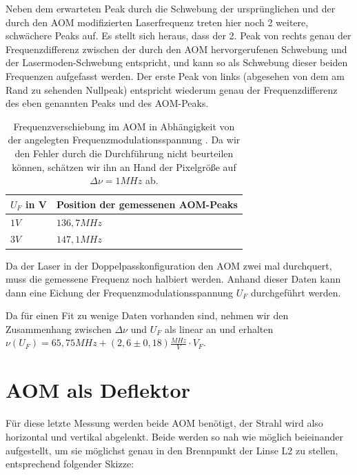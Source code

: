 \documentclass[bigchapter,colorback,accentcolor=tud4b,linedtoc,11pt]{tudreport}
\begin{document}
Neben dem erwarteten Peak durch die Schwebung der ursprünglichen und der durch den AOM modifizierten Laserfrequenz treten hier noch 2 weitere, schwächere Peaks auf. Es stellt sich heraus, dass der 2. Peak von rechts genau der Frequenzdifferenz zwischen der durch den AOM hervorgerufenen Schwebung und der Lasermoden-Schwebung entspricht, und kann so als Schwebung dieser beiden Frequenzen aufgefasst werden. Der erste Peak von links (abgesehen von dem am Rand zu sehenden Nullpeak) entspricht wiederum genau der Frequenzdifferenz des eben genannten Peaks und des AOM-Peaks.

\begin{table}[H]
  \begin{center}
    \begin{tabular}{|p{3cm}|p{6cm}|}
      \hline
          $U_F$ in V & Position der gemessenen AOM-Peaks \\ \hline
          $1V$       & $136,7 MHz$                       \\ \hline
          $3V$       & $147,1 MHz$                       \\ \hline
    \end{tabular}
  \end{center}
  \caption{Frequenzverschiebung im AOM in Abhängigkeit von der angelegten Frequenzmodulationsspannung \cite{AndereGruppe}. Da wir den Fehler durch die Durchführung nicht beurteilen können, schätzen wir ihn an Hand der Pixelgröße auf $\Delta \nu = 1 MHz$ ab.}
\end{table}

Da der Laser in der Doppelpasskonfiguration den AOM zwei mal durchquert, muss die gemessene Frequenz noch halbiert werden. Anhand dieser Daten kann dann eine Eichung der Frequenzmodulationsspannung $U_F$ durchgeführt werden. 

Da für einen Fit zu wenige Daten vorhanden sind, nehmen wir den Zusammenhang zwischen $\Delta \nu$ und $U_F$ als linear an und erhalten $\nu\left( U_F \right) = 65,75 MHz + \left( 2,6 \pm 0,18 \right)\frac{MHz}{V} \cdot V_F$.


\section{AOM als Deflektor}

Für diese letzte Messung werden beide AOM benötigt, der Strahl wird also horizontal und vertikal abgelenkt. Beide werden so nah wie möglich beieinander aufgestellt, um sie möglichst genau in den Brennpunkt der Linse L2 zu stellen, entsprechend folgender Skizze:
\end{document}
